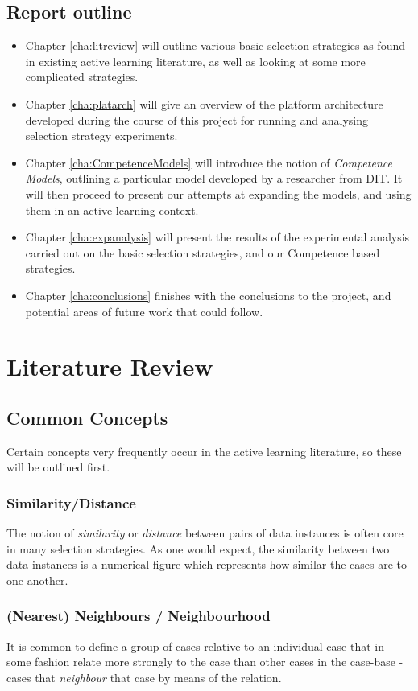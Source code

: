 \documentclass[a4paper,11pt]{report}
\begin{document}
\section{Report outline}
\begin{itemize}
	\item Chapter \ref{cha:litreview} will outline various basic selection strategies as found in existing active learning literature, as well as looking at some more complicated strategies.
	\item Chapter \ref{cha:platarch} will give an overview of the platform architecture developed during the course of this project for running and analysing selection strategy experiments.
	\item Chapter \ref{cha:CompetenceModels} will introduce the notion of \emph{Competence Models}, outlining a particular model developed by a researcher from DIT. It will then proceed to present our attempts at expanding the models, and using them in an active learning context.
	\item Chapter \ref{cha:expanalysis} will present the results of the experimental analysis carried out on the basic selection strategies, and our Competence based strategies.
	\item Chapter \ref{cha:conclusions} finishes with the conclusions to the project, and potential areas of future work that could follow.
\end{itemize}

\chapter{Literature Review\label{cha:litreview}}

\section{Common Concepts}
Certain concepts very frequently occur in the active learning literature, so these will be outlined first.

\subsection{Similarity/Distance}
The notion of \emph{similarity} or \emph{distance} between pairs of data instances is often core in many selection strategies. As one would expect, the similarity between two data instances is a numerical figure which represents how similar the cases are to one another.

\subsection{(Nearest) Neighbours / Neighbourhood}
It is common to define a group of cases relative to an individual case that in some fashion relate more strongly to the case than other cases in the case-base - cases that \emph{neighbour} that case by means of the relation.
\end{document}
